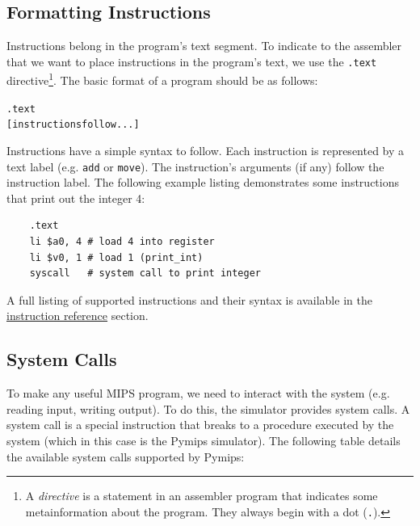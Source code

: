\documentclass[12pt]{article}
\begin{document}
\subsection{Formatting Instructions}

Instructions belong in the program's text segment. To indicate to the assembler
     that we want to place instructions in the program's text, we use the
     \texttt{.text} directive\footnote{A \textit{directive} is a statement in an
     assembler program that indicates some metainformation about the
     program. They always begin with a dot (\texttt{.}).}. The basic format of a
     program should be as follows:

\begin{alltt}
    .text
    [instructions follow...]
\end{alltt}

Instructions have a simple syntax to follow. Each instruction is represented by
     a text label (e.g. \texttt{add} or \texttt{move}). The instruction's
     arguments (if any) follow the instruction label. The following example
     listing demonstrates some instructions that print out the integer 4:

\begin{lstlisting}
    .text
    li $a0, 4 # load 4 into register
    li $v0, 1 # load 1 (print_int)
    syscall   # system call to print integer
\end{lstlisting}

A full listing of supported instructions and their syntax is available in the
     \hyperref[sec:iref]{instruction reference} section.

\subsection{System Calls}

To make any useful MIPS program, we need to interact with the system
     (e.g. reading input, writing output). To do this, the simulator provides
     system calls. A system call is a special instruction that breaks to a
     procedure executed by the system (which in this case is the Pymips
     simulator). The following table details the available system calls
     supported by Pymips:\\
\end{document}

